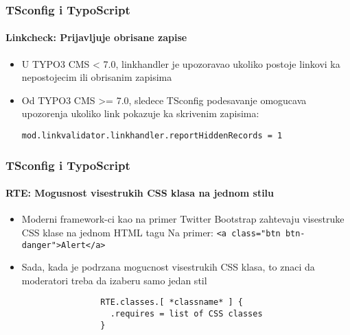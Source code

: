 
\begin{frame}[fragile]
	\frametitle{TSconfig i TypoScript}
	\framesubtitle{Linkcheck: Prijavljuje obrisane zapise}

	\begin{itemize}
		\item U TYPO3 CMS < 7.0, linkhandler je upozoravao ukoliko postoje linkovi ka nepostojecim ili obrisanim zapisima
		\item Od TYPO3 CMS >=  7.0, sledece TSconfig podesavanje omogucava upozorenja ukoliko link pokazuje ka skrivenim zapisima:

			\lstinline!mod.linkvalidator.linkhandler.reportHiddenRecords = 1!

	\end{itemize}

\end{frame}


\begin{frame}[fragile]
	\frametitle{TSconfig i TypoScript}
	\framesubtitle{RTE: Mogusnost visestrukih CSS klasa na jednom stilu}

	\begin{itemize}
		\item Moderni framework-ci kao na primer Twitter Bootstrap zahtevaju visestruke CSS klase na jednom HTML tagu\newline
			\small Na primer: \texttt{<a class="btn btn-danger">Alert</a>}\normalsize
		\item Sada, kada je podrzana mogucnost visestrukih CSS klasa, to znaci da moderatori treba da izaberu samo jedan stil

			\begin{lstlisting}
				RTE.classes.[ *classname* ] {
				  .requires = list of CSS classes
				}
			\end{lstlisting}

	\end{itemize}

\end{frame}

